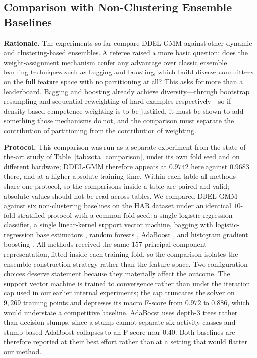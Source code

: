 \documentclass[lettersize,journal]{IEEEtran}
\newcommand{\tfourhighlight}{\color{tier4blue}}
\begin{document}
{{		{\tfourhighlight
\subsection{Comparison with Non-Clustering Ensemble Baselines}
		
		\noindent \textbf{Rationale.} The experiments so far compare DDEL-GMM against other dynamic and clustering-based ensembles. A referee raised a more basic question: does the weight-assignment mechanism confer any advantage over classic ensemble learning techniques such as bagging and boosting, which build diverse committees on the full feature space with no partitioning at all? This asks for more than a leaderboard. Bagging and boosting already achieve diversity---through bootstrap resampling and sequential reweighting of hard examples respectively---so if density-based competence weighting is to be justified, it must be shown to add something those mechanisms do not, and the comparison must separate the contribution of partitioning from the contribution of weighting.
		
		\noindent \textbf{Protocol.} This comparison was run as a separate experiment from the state-of-the-art study of Table~\ref{tab:sota_comparison}, under its own fold seed and on different hardware; DDEL-GMM therefore appears at $0.9742$ here against $0.9683$ there, and at a higher absolute training time. Within each table all methods share one protocol, so the comparisons inside a table are paired and valid; absolute values should not be read across tables. We compared DDEL-GMM against six non-clustering baselines on the HAR dataset under an identical $10$-fold stratified protocol with a common fold seed: a single logistic-regression classifier, a single linear-kernel support vector machine, bagging with logistic-regression base estimators \cite{breiman_bagging_1996}, random forests \cite{breiman_random_2001}, AdaBoost \cite{freund_decision-theoretic_1997}, and histogram gradient boosting \cite{friedman_greedy_2001}. All methods received the same $157$-principal-component representation, fitted inside each training fold, so the comparison isolates the ensemble construction strategy rather than the feature space. Two configuration choices deserve statement because they materially affect the outcome. The support vector machine is trained to convergence rather than under the iteration cap used in our earlier internal experiments; the cap truncates the solver on $9{,}269$ training points and depresses its macro F-score from $0.972$ to $0.886$, which would understate a competitive baseline. AdaBoost uses depth-$3$ trees rather than decision stumps, since a stump cannot separate six activity classes and stump-based AdaBoost collapses to an F-score near $0.40$. Both baselines are therefore reported at their best effort rather than at a setting that would flatter our method.

}}}
\end{document}
